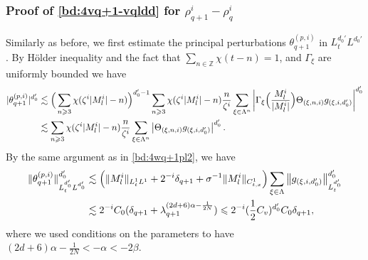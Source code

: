 \documentclass[UTF-8,reqno]{amsart}
\numberwithin{equation}{section}
\theoremstyle{definition}
\def\({{\Big(}}
\def\){{\Big)}}
\newcommand{\norm}[1]{\left\|#1\right\|}
\def\geq{\geqslant}
\def\leq{\leqslant}
\def\({{\Big(}}
\def\){{\Big)}}
\def\geq{\geqslant}
\def\leq{\leqslant}
\begin{document}
\subsubsection{Proof of  \eqref{bd:4vq+1-vqldd} for $\rho^{i}_{q+1}-\rho_q^i$}\label{sec:4esttheq+1}
Similarly as before, we first estimate the principal perturbations  $\theta^{(p,i)}_{q+1}$ in $L^{d_0'}_tL^{d_0'}$.  By H\"older inequality and the fact that  $\sum_{n\in\mathbb{Z}} {\chi}(t - n) =1$, and $\Gamma_{\xi}$ are uniformly bounded we have
\begin{align}
|\theta_{q+1}^{(p,i)}|^{d_0'}
&\lesssim\(\sum_{n\geq3}\chi(\zeta^{i}|M^{i}_l|-n)\)^{d_0'-1}\sum_{n\geq3}\chi(\zeta^{i}|M^{i}_l|-n)\frac{n}{\zeta^{i}}\sum_{\xi\in\Lambda^{n}}\left|\Gamma_{\xi}\(\frac{M^{i}_l}{|M^{i}_l|}\)\Theta_{(\xi,n,i)}g_{(\xi,i,d_0')}\right|^{d_0'}\notag\\
&\lesssim \sum_{n\geq3}\chi(\zeta^{i}|M^{i}_l|-n)\frac{n}{\zeta^{i}}\sum_{\xi\in\Lambda^{n}}\left|\Theta_{(\xi,n,i)}g_{(\xi,i,d_0')}\right|^{d_0'}.\notag
\end{align} 
By the same argument as in \eqref{bd:4wq+1pl2}, we have 
\begin{align}
    \|\theta_{q+1}^{(p,i)}\|_{L^{d_0'}_tL^{d_0'}}^{d_0'}&\lesssim \(\|M^{i}_l\|_{L^1_tL^1}+2^{-i}\delta_{q+1}+\sigma^{-1}\|M^{i}_l\|_{C_{t,x}^1}\)
    \sum_{\xi\in\Lambda }\norm{g_{(\xi,i,d_0')}}^{d_0'}_{L_t^{d_0'}}
    \notag\\
    &\lesssim 2^{-i}C_0(\delta_{q+1}+\lambda_{q+1}^{(2d+6)\alpha-\frac{1}{2N}})\leq 2^{-i}(\frac12C_v)^{d_0'}C_0\delta_{q+1},\label{bd:4theq+1pl2}
\end{align}
where we used  conditions on the parameters to have $(2d+6)\alpha-\frac{1}{2N}<-\alpha<-2\beta$.
\end{document}
